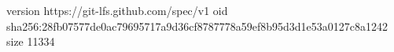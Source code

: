 version https://git-lfs.github.com/spec/v1
oid sha256:28fb07577de0ac79695717a9d36cf8787778a59ef8b95d3d1e53a0127c8a1242
size 11334
